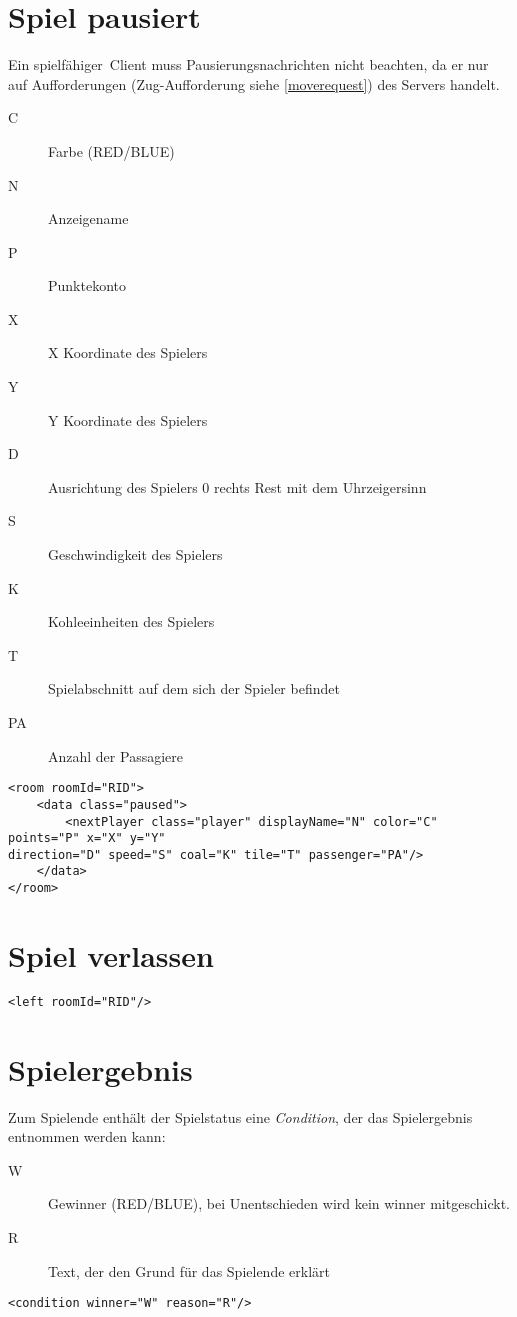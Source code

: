 \documentclass[12pt,a4paper, ngerman, oneside]{scrartcl}
\begin{document}
\section{Spiel pausiert}
Ein \glqq spielfähiger\grqq\ Client muss Pausierungsnachrichten nicht beachten,
da er nur auf Aufforderungen (Zug-Aufforderung siehe \ref{moverequest}) des Servers handelt.
\begin{description}
\item[C] Farbe (RED/BLUE)
\item[N] Anzeigename
\item[P] Punktekonto
\item[X] X Koordinate des Spielers
\item[Y] Y Koordinate des Spielers
\item[D] Ausrichtung des Spielers 0 rechts Rest mit dem Uhrzeigersinn
\item[S] Geschwindigkeit des Spielers
\item[K] Kohleeinheiten des Spielers
\item[T] Spielabschnitt auf dem sich der Spieler befindet
\item[PA] Anzahl der Passagiere
\end{description}
\begin{verbatim}
<room roomId="RID">
	<data class="paused">
		<nextPlayer class="player" displayName="N" color="C" points="P" x="X" y="Y" 
direction="D" speed="S" coal="K" tile="T" passenger="PA"/>
	</data>
</room>
\end{verbatim}

\section{Spiel verlassen}
\begin{verbatim}
<left roomId="RID"/>
\end{verbatim}


\section{\label{gameend}Spielergebnis}
Zum Spielende enthält der Spielstatus eine \textit{Condition}, der das Spielergebnis entnommen werden kann:
\begin{description}
\item[W] Gewinner (RED/BLUE), bei Unentschieden wird kein winner mitgeschickt.
\item[R] Text, der den Grund für das Spielende erklärt
\end{description}
\begin{verbatim}
<condition winner="W" reason="R"/>
\end{verbatim}
\end{document}
